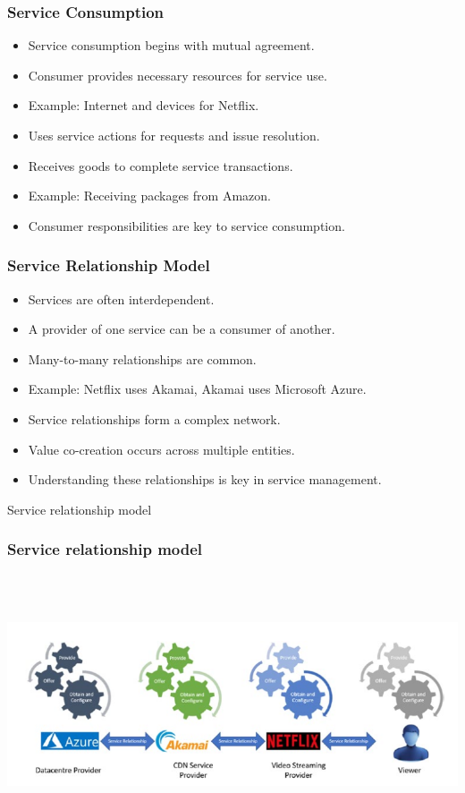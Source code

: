 \documentclass[aspectratio=169, table]{beamer}
\begin{document}
\begin{frame}
	\frametitle{Service Consumption}
	\begin{itemize}
		\item Service consumption begins with mutual agreement.
		\item Consumer provides necessary resources for service use.
		\item Example: Internet and devices for Netflix.
		\item Uses service actions for requests and issue resolution.
		\item Receives goods to complete service transactions.
		\item Example: Receiving packages from Amazon.
		\item Consumer responsibilities are key to service consumption.
	\end{itemize}
\end{frame}

\begin{frame}
	\frametitle{Service Relationship Model}
	\begin{itemize}
		\item Services are often interdependent.
		\item A provider of one service can be a consumer of another.
		\item Many-to-many relationships are common.
		\item Example: Netflix uses Akamai, Akamai uses Microsoft Azure.
		\item Service relationships form a complex network.
		\item Value co-creation occurs across multiple entities.
		\item Understanding these relationships is key in service management.
	\end{itemize}
\end{frame}

\begin{frame}{Service relationship model} 	 \frametitle{Service relationship model} \begin{center} 	\includegraphics[width=0.8\linewidth]{images/image-03.png} \end{center} \end{frame}
\end{document}
